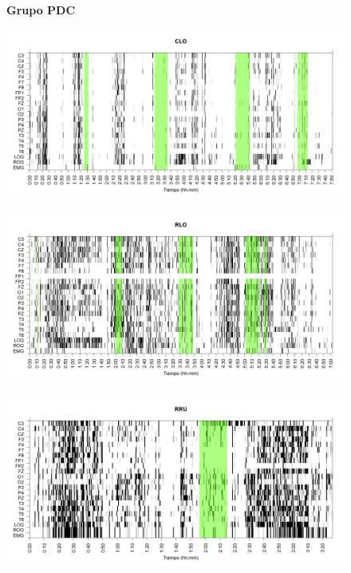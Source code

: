 
\begin{figure}
\Large{\textbf{Grupo PDC}}
\end{figure}

\begin{figure}
\centering
\includegraphics[width=0.8\linewidth]
{./img_ejemplos/CLMN10SUE_est.png} 
\label{grf_CLO}
\end{figure}

\begin{figure}
\centering
\includegraphics[width=0.8\linewidth]
{./img_ejemplos/RLMN10SUE_est.png} 
\label{grf_RLO}
\end{figure}

\begin{figure}
\centering
\includegraphics[width=0.8\linewidth]
{./img_ejemplos/RRMNS_est.png} 
\label{grf_RRU}
\end{figure}

